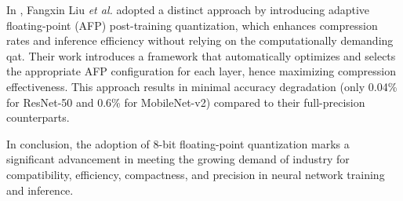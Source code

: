 In \cite{liu2021improving}, Fangxin Liu \textit{et al.} adopted a distinct approach by introducing adaptive floating-point (AFP) post-training quantization, which enhances compression rates and inference efficiency without relying on the computationally demanding \gls{qat}. Their work introduces a framework that automatically optimizes and selects the appropriate AFP configuration for each layer, hence maximizing compression effectiveness. This approach results in minimal accuracy degradation (only 0.04\% for ResNet-50 and 0.6\% for MobileNet-v2) compared to their full-precision counterparts.

In conclusion, the adoption of 8-bit floating-point quantization marks a significant advancement in meeting the growing demand of industry for compatibility, efficiency, compactness, and precision in neural network training and inference.